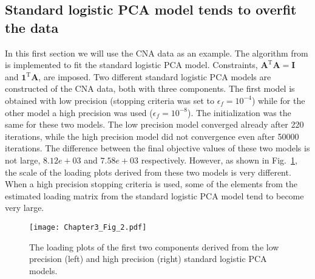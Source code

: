 \subsection{Standard logistic PCA model tends to overfit the data}
In this first section we will use the CNA data as an example. The algorithm from \cite{de2006principal} is implemented to fit the standard logistic PCA model. Constraints, $\mathbf{A}^{\text{T}}\mathbf{A} = \mathbf{I}$ and $\mathbf{1}^{\text{T}}\mathbf{A}$, are imposed. Two different standard logistic PCA models  are constructed of the CNA data, both with three components. The first model is obtained with low precision (stopping criteria was set to $\epsilon_f=10^{-4}$) while for the other model a high precision was used ($\epsilon_f=10^{-8}$). The initialization was the same for these two models. The low precision model converged already after 220 iterations, while the high precision model did not convergence even after 50000 iterations. The difference between the final objective values of these two models is not large, $8.12e+03$ and $7.58e+03$ respectively. However, as shown in Fig.~\ref{chapter3_fig:2}, the scale of the loading plots derived from these two models is very different. When a high precision stopping criteria is used, some of the elements from the estimated loading matrix from the standard logistic PCA model tend to become very large.

\begin{figure}[htbp]
    \centering
    \texttt{[image: Chapter3\_Fig\_2.pdf]}
    \caption{The loading plots of the first two components derived from the low precision (left) and high precision (right) standard logistic PCA models.}
    \label{chapter3_fig:2}
\end{figure}

